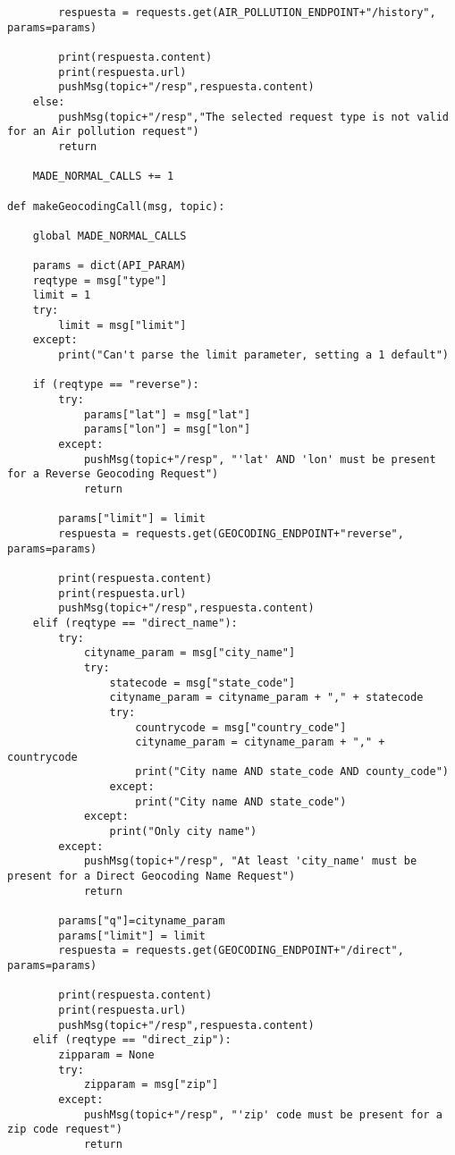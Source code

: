 \documentclass{scrbook}
\begin{document}
{\begin{verbatim}
        respuesta = requests.get(AIR_POLLUTION_ENDPOINT+"/history", params=params)

        print(respuesta.content)
        print(respuesta.url)
        pushMsg(topic+"/resp",respuesta.content)
    else:
        pushMsg(topic+"/resp","The selected request type is not valid for an Air pollution request")
        return

    MADE_NORMAL_CALLS += 1

def makeGeocodingCall(msg, topic):

    global MADE_NORMAL_CALLS

    params = dict(API_PARAM)
    reqtype = msg["type"]
    limit = 1
    try:
        limit = msg["limit"]
    except:
        print("Can't parse the limit parameter, setting a 1 default")

    if (reqtype == "reverse"):
        try:
            params["lat"] = msg["lat"]
            params["lon"] = msg["lon"]
        except:
            pushMsg(topic+"/resp", "'lat' AND 'lon' must be present for a Reverse Geocoding Request")
            return
        
        params["limit"] = limit
        respuesta = requests.get(GEOCODING_ENDPOINT+"reverse", params=params)

        print(respuesta.content)
        print(respuesta.url)
        pushMsg(topic+"/resp",respuesta.content)
    elif (reqtype == "direct_name"):
        try:
            cityname_param = msg["city_name"]
            try:
                statecode = msg["state_code"]
                cityname_param = cityname_param + "," + statecode
                try:
                    countrycode = msg["country_code"]
                    cityname_param = cityname_param + "," + countrycode
                    print("City name AND state_code AND county_code")
                except:
                    print("City name AND state_code")
            except:
                print("Only city name")
        except:
            pushMsg(topic+"/resp", "At least 'city_name' must be present for a Direct Geocoding Name Request")
            return

        params["q"]=cityname_param
        params["limit"] = limit
        respuesta = requests.get(GEOCODING_ENDPOINT+"/direct", params=params)

        print(respuesta.content)
        print(respuesta.url)
        pushMsg(topic+"/resp",respuesta.content)
    elif (reqtype == "direct_zip"):
        zipparam = None
        try:
            zipparam = msg["zip"]
        except:
            pushMsg(topic+"/resp", "'zip' code must be present for a zip code request")
            return


\end{verbatim}}
\end{document}
